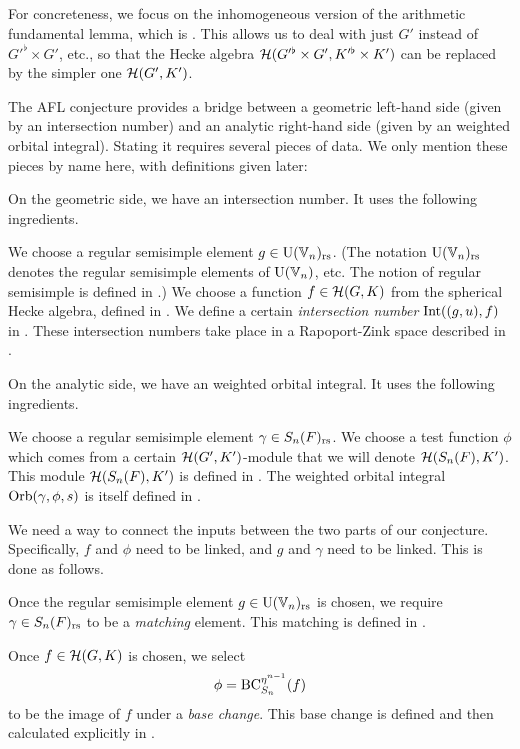 For concreteness, we focus on the inhomogeneous version
of the arithmetic fundamental lemma, which is \cite[Conjecture 6.2.1]{ref:AFLspherical}.
This allows us to deal with just $G'$ instead of $G'^\flat \times G'$, etc.,
so that the Hecke algebra $\mathcal H(G'^\flat \times G', K'^\flat \times K')$
can be replaced by the simpler one $\mathcal H(G', K')$.

The AFL conjecture provides a bridge between a geometric left-hand side
(given by an intersection number)
and an analytic right-hand side (given by an weighted orbital integral).
Stating it requires several pieces of data.
We only mention these pieces by name here, with definitions given later:
\begin{itemize}
  \ii On the geometric side, we have an intersection number.
  It uses the following ingredients.
  \begin{itemize}
    \ii We choose a regular semisimple element $g \in \operatorname{U}(\mathbb V_n)_{\mathrm{rs}}$.
    (The notation $\operatorname{U}(\mathbb V_n)_{\mathrm{rs}}$ denotes the regular semisimple elements of $\operatorname{U}(\mathbb V_n)$, etc.
    The notion of regular semisimple is defined in .)
    \ii We choose a function $f \in \mathcal H(G, K)$ from the spherical Hecke algebra,
    defined in .
    \ii We define a certain \emph{intersection number} $\operatorname{Int}((g,u), f)$
    in .
    These intersection numbers take place in a Rapoport-Zink space
    described in .
  \end{itemize}

  \ii On the analytic side, we have an weighted orbital integral.
  It uses the following ingredients.
  \begin{itemize}
    \ii We choose a regular semisimple element $\gamma \in S_n(F)_{\mathrm{rs}}$.
    \ii We choose a test function $\phi$ which comes
    from a certain $\mathcal H(G',K')$-module that we will denote $\mathcal H(S_n(F), K')$.
    This module $\mathcal H(S_n(F), K')$ is defined in .
    \ii The weighted orbital integral $\operatorname{Orb}(\gamma, \phi, s)$
    is itself defined in .
  \end{itemize}

  \ii We need a way to connect the inputs between the two parts of our conjecture.
  Specifically, $f$ and $\phi$ need to be linked, and $g$ and $\gamma$ need to be linked.
  This is done as follows.
  \begin{itemize}
    \ii Once the regular semisimple element $g \in \operatorname{U}(\mathbb V_n)_{\mathrm{rs}}$ is chosen,
    we require $\gamma \in S_n(F)_{\mathrm{rs}}$ to be a \emph{matching} element.
    This matching is defined in .

    \ii Once $f \in \mathcal H(G,K)$ is chosen, we select
    \[ \phi = \operatorname{BC}_{S_n}^{\eta^{n-1}}(f) \]
    to be the image of $f$ under a \emph{base change}.
    This base change is defined and then calculated explicitly in .
  \end{itemize}
\end{itemize}
